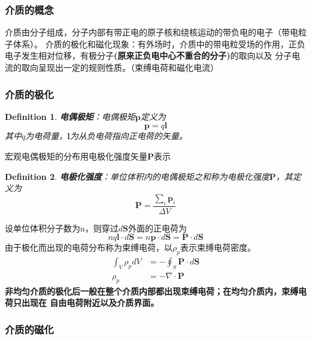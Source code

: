 \documentclass[12pt,a4paper]{ctexart}
\numberwithin{equation}{subsection}
\newtheorem{definition}{Definition}
\begin{document}
\subsubsection{介质的概念}
介质由分子组成，分子内部有带正电的原子核和绕核运动的带负电的电子（带电粒子体系）。
介质的极化和磁化现象：有外场时，介质中的带电粒受场的作用，正负电子发生相对位移，有极分子\textbf{(原来正负电中心不重合的分子)}的取向以及
分子电流的取向呈现出一定的规则性质。（束缚电荷和磁化电流）

\subsubsection{介质的极化}
\begin{definition}
\textbf{电偶极矩}：电偶极矩$\mathbf{p}$定义为
\begin{equation}
\mathbf{p}=q\mathbf{l}
\end{equation}
其中$q$为电荷量，$\mathbf{l}$为从负电荷指向正电荷的矢量。
\end{definition}
宏观电偶极矩的分布用电极化强度矢量$\mathbf{P}$表示
\begin{definition}
\textbf{电极化强度}：单位体积内的电偶极矩之和称为电极化强度$\mathbf{P}$，其定义为
\begin{equation}
\mathbf{P}=\frac{\sum_i \mathbf{p}_i}{\Delta V}
\end{equation}
\end{definition}
设单位体积分子数为n，则穿过$d\mathbf{S}$外面的正电荷为
\begin{equation}
nq\mathbf{l}\cdot d\mathbf{S}=n\mathbf{p}\cdot d\mathbf{S}=\mathbf{P}\cdot d\mathbf{S}
\end{equation}
由于极化而出现的电荷分布称为束缚电荷，以$\rho_p$表示束缚电荷密度。
\begin{equation}
\begin{aligned}
\int_V \rho_p dV &= -\oint_S \mathbf{P}\cdot d\mathbf{S}\\
\rho_p &= -\nabla\cdot\mathbf{P}
\end{aligned}
\end{equation}
\textbf{非均匀介质的极化后一般在整个介质内部都出现束缚电荷；在均匀介质内，束缚电荷只出现在
自由电荷附近以及介质界面。}



\subsubsection{介质的磁化}
\end{document}
